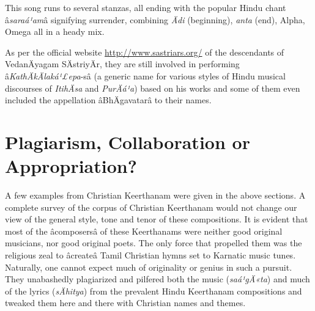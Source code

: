 This song runs to several stanzas, all ending with the popular Hindu chant â\textit{saraá¹am}â signifying surrender, combining \textit{Ädi} (beginning), \textit{anta} (end), Alpha, Omega all in a heady mix.

As per the official website \url{http://www.sastriars.org/} of the descendants of VedanÄyagam SÄstriyÄr, they are still involved in performing â\textit{KathÄkÄlaká¹£epa}-sâ (a generic name for various styles of Hindu musical discourses of \textit{ItihÄsa} and \textit{PurÄá¹a}) based on his works and some of them even included the appellation âBhÄgavatarâ to their names.


\section*{Plagiarism, Collaboration or Appropriation?}

A few examples from Christian Keerthanam were given in the above sections. A complete survey of the corpus of Christian Keerthanam would not change our view of the general style, tone and tenor of these compositions. It is evident that most of the âcomposersâ of these Keerthanams were neither good original musicians, nor good original poets. The only force that propelled them was the religious zeal to âcreateâ Tamil Christian hymns set to Karnatic music tunes. Naturally, one cannot expect much of originality or genius in such a pursuit. They unabashedly plagiarized and pilfered both the music (\textit{saá¹gÄ«ta}) and much of the lyrics (\textit{sÄhitya}) from the prevalent Hindu Keerthanam compositions and tweaked them here and there with Christian names and themes.

